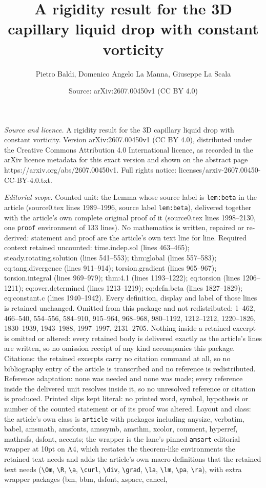 \documentclass[10pt,a4paper]{amsart}
\title[A rigidity result for the 3D capillary liquid drop with cons]{A rigidity result for the 3D capillary liquid drop with constant vorticity}
\author{Pietro Baldi, Domenico Angelo La Manna, Giuseppe La Scala}
\date{Source: arXiv:2607.00450v1 (CC BY 4.0)}
\begin{document}
\maketitle

\noindent\emph{Source and licence.} A rigidity result for the 3D capillary liquid drop with constant vorticity. Version arXiv:2607.00450v1 (CC BY 4.0), distributed under the Creative Commons Attribution 4.0 International licence, as recorded in the arXiv licence metadata for this exact version and shown on the abstract page https://arxiv.org/abs/2607.00450v1. Full rights notice: licenses/arxiv-2607.00450-CC-BY-4.0.txt.\par\smallskip

\noindent\textit{Editorial scope.} Counted unit: the Lemma whose source label is \texttt{lem:beta} in the article (source0.tex lines 1989--1996, source label \texttt{lem:beta}), delivered together with the article's own complete original proof of it (source0.tex lines 1998--2130, one \texttt{proof} environment of 133 lines). No mathematics is written, repaired or re-derived: statement and proof are the article's own text line for line. Required context retained uncounted: time.indep.sol (lines 463--465); steady.rotating.solution (lines 541--553); thm:global (lines 557--583); eq:tang.divergence (lines 911--914); torsion.gradient (lines 965--967); torsion.integral (lines 969--979); thm:4.1 (lines 1193--1222); eq:torsion (lines 1206--1211); eq:over.determined (lines 1213--1219); eq:defn.beta (lines 1827--1829); eq:constant.c (lines 1940--1942). Every definition, display and label of those lines is retained unchanged. Omitted from this package and not redistributed: 1--462, 466--540, 554--556, 584--910, 915--964, 968--968, 980--1192, 1212--1212, 1220--1826, 1830--1939, 1943--1988, 1997--1997, 2131--2705. Nothing inside a retained excerpt is omitted or altered: every retained body is delivered exactly as the article's lines are written, so no omission receipt of any kind accompanies this package. Citations: the retained excerpts carry no citation command at all, so no bibliography entry of the article is transcribed and no reference is redistributed. Reference adaptation: none was needed and none was made; every reference inside the delivered unit resolves inside it, so no unresolved reference or citation is produced. Printed slips kept literal: no printed word, symbol, hypothesis or number of the counted statement or of its proof was altered. Layout and class: the article's own class is \texttt{article} with packages including anysize, verbatim, babel, amsmath, amsfonts, amssymb, amsthm, xcolor, comment, hyperref, mathrsfs, dsfont, accents; the wrapper is the lane's pinned \texttt{amsart} editorial wrapper at 10pt on A4, which restates the theorem-like environments the retained text needs and adds the article's own macro definitions that the retained text needs (\texttt{\textbackslash Om}, \texttt{\textbackslash R}, \texttt{\textbackslash a}, \texttt{\textbackslash curl}, \texttt{\textbackslash div}, \texttt{\textbackslash grad}, \texttt{\textbackslash la}, \texttt{\textbackslash lm}, \texttt{\textbackslash pa}, \texttt{\textbackslash ra}), with extra wrapper packages (bm, bbm, dsfont, xspace, cancel, 
\end{document}
